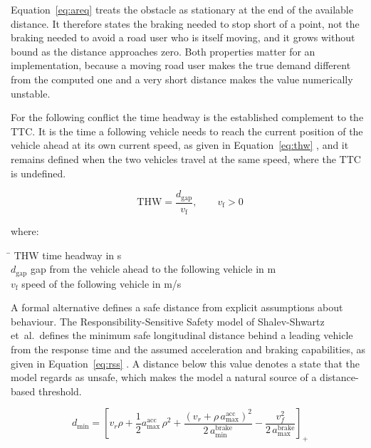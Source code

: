 Equation~\eqref{eq:areq} treats the obstacle as stationary at the end of the available
distance. It therefore states the braking needed to stop short of a point, not the
braking needed to avoid a road user who is itself moving,
and it grows without bound as the distance approaches zero. Both properties matter for
an implementation, because a moving road user makes the true demand different from the
computed one and a very short distance makes the value numerically unstable.

For the following conflict the time headway is the established complement to the
\ac{TTC}. It is the time a following vehicle needs to reach the current position of
the vehicle ahead at its own current speed, as given in Equation~\eqref{eq:thw} \cite{westhofen2023}, and it
remains defined when the two vehicles travel at the same speed, where the \ac{TTC} is
undefined.

\begin{equation}
    \mathrm{THW} = \frac{d_\mathrm{gap}}{v_\mathrm{f}}, \qquad v_\mathrm{f} > 0
    \label{eq:thw}
\end{equation}

where:\nopagebreak
\begin{tabbing}
    \hspace{2.2cm} \= \kill
    $\mathrm{THW}$ \> time headway in s \\
    $d_\mathrm{gap}$ \> gap from the vehicle ahead to the following vehicle in m \\
    $v_\mathrm{f}$ \> speed of the following vehicle in m/s
\end{tabbing}

A formal alternative defines a safe distance from explicit assumptions about
behaviour. The Responsibility-Sensitive Safety model of Shalev-Shwartz et~al.\ defines
the minimum safe longitudinal distance behind a leading vehicle from the response time
and the assumed acceleration and braking capabilities, as given in
Equation~\eqref{eq:rss} \cite{shalev2017rss}. A distance below this value denotes a state
that the model regards as unsafe, which makes the model a natural source of a
distance-based threshold.

\begin{equation}
    d_\mathrm{min} = \left[ v_r \rho + \frac{1}{2} a_\mathrm{max}^\mathrm{acc}\,\rho^{2}
    + \frac{\left(v_r + \rho\,a_\mathrm{max}^\mathrm{acc}\right)^{2}}{2\,a_\mathrm{min}^\mathrm{brake}}
    - \frac{v_f^{2}}{2\,a_\mathrm{max}^\mathrm{brake}} \right]_{+}
    \label{eq:rss}
\end{equation}


